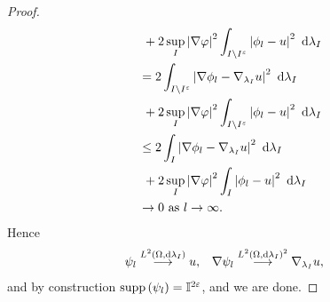 \begin{proof}
\begin{align*}
		&\ + 2\sup_I\left\lvert \nabla\varphi \right\rvert^2\int_{I\setminus I^\varepsilon}\left\lvert  \phi_l - u  \right\rvert^2 \ \mathrm{d}\lambda_I \\
		&= 2\int_{I\setminus I^\varepsilon}\left\lvert \nabla\phi_l - \nabla_{\lambda_I}u \right\rvert^2 \ \mathrm{d}\lambda_I \\
		&\ + 2\sup_I\left\lvert \nabla\varphi \right\rvert^2\int_{I\setminus I^\varepsilon}\left\lvert  \phi_l - u  \right\rvert^2 \ \mathrm{d}\lambda_I \\
		&\leq 2\int_{I}\left\lvert \nabla\phi_l - \nabla_{\lambda_I}u \right\rvert^2 \ \mathrm{d}\lambda_I \\
		&\ + 2\sup_I\left\lvert \nabla\varphi \right\rvert^2\int_{I}\left\lvert  \phi_l - u  \right\rvert^2 \ \mathrm{d}\lambda_I \\
		&\rightarrow 0 \ \text{as} \ l \rightarrow\infty.
	\end{align*}
	Hence 
	\begin{align*}
		\psi_l \overset{L^{2}\left( \Omega,\mathrm{d}\lambda_I \right)}{\longrightarrow} u, &\quad \nabla\psi_l \overset{L^{2}\left( \Omega,\mathrm{d}\lambda_I \right)^2}{\longrightarrow} \nabla_{\lambda_I} u,
	\end{align*}
	and by construction $\mathrm{supp}\left( \psi_l \right) = \mathbb{I}^{2\varepsilon}$, and we are done.
\end{proof}

